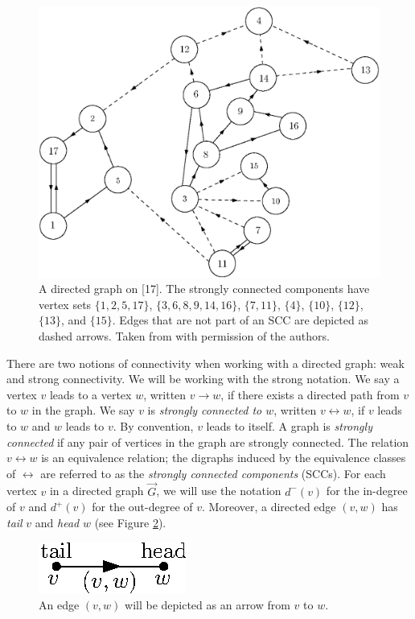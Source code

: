 \begin{figure}
    \centering
    \includegraphics[scale=0.6]{Content/Pictures/biggraph.eps}
    \caption{A directed graph on [17]. The strongly connected components have vertex sets $\{1,2,5,17\}$, $\{3,6,8,9,14,16\}$, $\{7,11\}$, $\{4\}$, $\{10\}$, $\{12\}$, $\{13\}$, and $\{15\}$. Edges that are not part of an SCC are depicted as dashed arrows. Taken from \cite{goldschmidtScalingLimitCritical2019} with permission of the authors.}
    \label{fig.SCCs}
\end{figure}

There are two notions of connectivity when working with a directed graph: weak and strong connectivity. We will be working with the strong notation. We say a vertex $v$ leads to a vertex $w$, written $v \rightarrow w$, if there exists a directed path from $v$ to $w$ in the graph. We say $v$ is \emph{strongly connected to $w$}, written $v \leftrightarrow w$, if $v$ leads to $w$ and $w$ leads to $v$. By convention, $v$ leads to itself. A graph is \emph{strongly connected} if any pair of vertices in the graph are strongly connected. The relation $v \leftrightarrow w$ is an equivalence relation; the digraphs induced by the equivalence classes of $\leftrightarrow$ are referred to as the \emph{strongly connected components} (SCCs). For each vertex $v$ in a directed graph $\vec{G}$, we will use the notation $d^-(v)$ for the in-degree of $v$ and $d^+(v)$ for the out-degree of $v$. Moreover, a directed edge $(v,w)$ has \emph{tail} $v$ and \emph{head} $w$ (see Figure \ref{fig.tailhead}).
\begin{figure}
    \centering
    \includegraphics{Content/Pictures/tail_head.eps}
    \caption{An edge $(v,w)$ will be depicted as an arrow from $v$ to $w$.}\label{fig.tailhead}
\end{figure}



